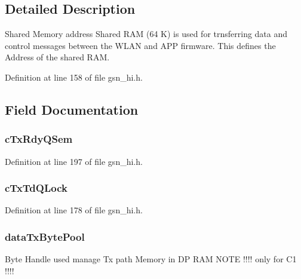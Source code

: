 \subsection{Detailed Description}
Shared Memory address Shared RAM (64 K) is used for trnsferring data and control messages between the WLAN and APP firmware. This defines the Address of the shared RAM. 

Definition at line 158 of file gsn\_\-hi.h.



\subsection{Field Documentation}
\hypertarget{a00085_a5fe078b045135031b58eb5a50a3730ee}{
\subsubsection[{cTxRdyQSem}]{ {\bf cTxRdyQSem}}}
\label{a00085_a5fe078b045135031b58eb5a50a3730ee}


Definition at line 197 of file gsn\_\-hi.h.

\hypertarget{a00085_ae2d5d0c9675b0d674342c852d924a7d4}{
\subsubsection[{cTxTdQLock}]{ {\bf cTxTdQLock}}}
\label{a00085_ae2d5d0c9675b0d674342c852d924a7d4}


Definition at line 178 of file gsn\_\-hi.h.

\hypertarget{a00085_a5adb31ebca57dd3fa3941ae22fdef806}{
\subsubsection[{dataTxBytePool}]{ {\bf dataTxBytePool}}}
\label{a00085_a5adb31ebca57dd3fa3941ae22fdef806}
Byte Handle used manage Tx path Memory in DP RAM NOTE !!!! only for C1 !!!! 

